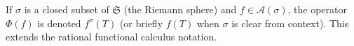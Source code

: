 If $\sigma$ is a closed subset of $\mathfrak{S}$ (the Riemann sphere) and $f \in \mathcal{A}(\sigma)$, the operator $\Phi(f)$ is denoted $f^\sigma(T)$ (or briefly $f(T)$ when $\sigma$ is clear from context). This extends the rational functional calculus notation.
